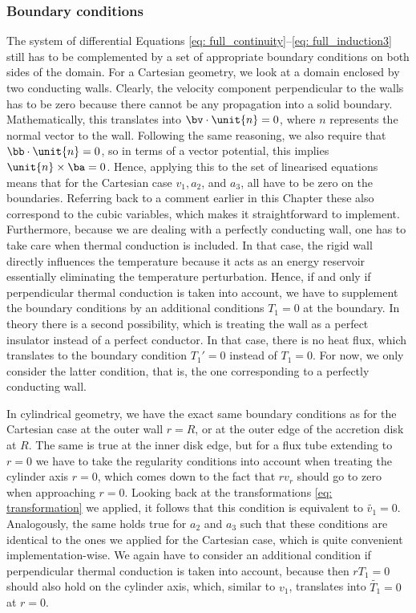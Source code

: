 \subsubsection{Boundary conditions}
The system of differential Equations \eqref{eq: full_continuity}--\eqref{eq: full_induction3} still has to be complemented by a set of appropriate boundary conditions on both sides of the domain. For a Cartesian geometry, we look at a domain enclosed by two conducting walls. Clearly, the velocity component perpendicular to the walls has to be zero because there cannot be any propagation into a solid boundary. Mathematically, this translates into $\bv \cdot \unit{n} = 0$, where $\unit{n}$ represents the normal vector to the wall. Following the same reasoning, we also require that $\bb \cdot \unit{n} = 0$, so in terms of a vector potential, this implies $\unit{n} \times \ba = 0$. Hence, applying this to the set of linearised equations means that for the Cartesian case $v_1, a_2$, and $a_3$, all have to be zero on the boundaries. Referring back to a comment earlier in this Chapter these also correspond to the cubic variables, which makes it straightforward to implement. Furthermore, because we are dealing with a perfectly conducting wall, one has to take care when thermal conduction is included. In that case, the rigid wall directly influences the temperature because it acts as an energy reservoir essentially eliminating the temperature perturbation. Hence, if and only if perpendicular thermal conduction is taken into account, we have to supplement the boundary conditions by an additional conditions $T_1 = 0$ at the boundary. In theory there is a second possibility, which is treating the wall as a perfect insulator instead of a perfect conductor. In that case, there is no heat flux, which translates to the boundary condition $T_1' = 0$ instead of $T_1 = 0$. For now, we only consider the latter condition, that is, the one corresponding to a perfectly conducting wall.

In cylindrical geometry, we have the exact same boundary conditions as for the Cartesian case at the outer wall $r = R$, or at the outer edge of the accretion disk at $R$. The same is true at the inner disk edge, but for a flux tube extending to $r = 0$ we have to take the regularity conditions into account when treating the cylinder axis $r = 0$, which comes down to the fact that $r v_r$ should go to zero when approaching $r = 0$. Looking back at the transformations \eqref{eq: transformation} we applied, it follows that this condition is equivalent to $\widetilde{v_1} = 0$. Analogously, the same holds true for $a_2$ and $a_3$ such that these conditions are identical to the ones we applied for the Cartesian case, which is quite convenient implementation-wise. We again have to consider an additional condition if perpendicular thermal conduction is taken into account, because then $r T_1 = 0$ should also hold on the cylinder axis, which, similar to $v_1$, translates into $\widetilde{T_1} = 0$ at $r = 0$.

